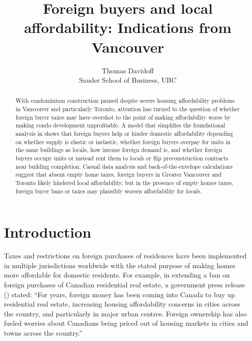 \documentclass[12pt]{article}
\begin{document}
\title{Foreign buyers and local affordability: Indications from Vancouver}
\author{Thomas Davidoff\\Sauder School of Business, UBC}
\maketitle

\onehalfspacing

\begin{abstract}

	With condominium construction paused despite severe housing affordability
	problems in Vancouver and particularly Toronto, attention has turned to
	the question of whether foreign buyer taxes may have overshot to the
	point of making affordability worse by making condo development
	unprofitable. A model that simplifies the foundational analysis in
	\textcite{favilukisVanNieuwerburgh} shows that foreign buyers help or
	hinder domestic affordability depending on whether supply is elastic or
	inelastic, whether foreign buyers overpay for units in the same
	buildings as locals, how intense foreign demand is, and whether foreign
	buyers occupy units or instead rent them to locals or flip
	preconstruction contracts near building completion. Casual data
	analysis and back-of-the-envelope calculations suggest that absent empty
	home taxes, foreign buyers in Greater Vancouver and Toronto likely
	hindered local affordability, but in the presence of empty homes taxes,
	foreign buyer bans or taxes may plausibly worsen affordability for locals.

\end{abstract}
\section{Introduction}

Taxes and restrictions on foreign purchases of residences have been implemented
in multiple jurisdictions worldwide with the stated purpose of making homes
more affordable for domestic residents. For example, in extending a ban on
foreign purchases of Canadian residential real estate, a government press
release (\textcite{gOC}) stated: ``For years, foreign money has been coming
into Canada to buy up residential real estate, increasing housing affordability
concerns in cities across the country, and particularly in major urban centres.
Foreign ownership has also fueled worries about Canadians being priced out of
housing markets in cities and towns across the country.''
\end{document}
